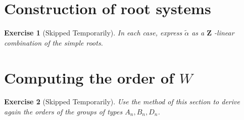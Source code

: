 \documentclass{article}
\theoremstyle{breakstyle}
\newtheorem{exercise}{Exercise}[section]
\begin{document}
\setcounter{section}{9}
\section{Construction of root systems}

\begin{exercise}[Skipped Temporarily]
In each case, express $\tilde{\alpha}$ as a $\mathbf{Z}$ -linear combination of
the simple roots.
\end{exercise}

\section{Computing the order of $W$}

\begin{exercise}[Skipped Temporarily]
Use the method of this section to derive again the orders of the groups of types
$A_{n}, B_{n}, D_{n}$.
\end{exercise}
\end{document}
